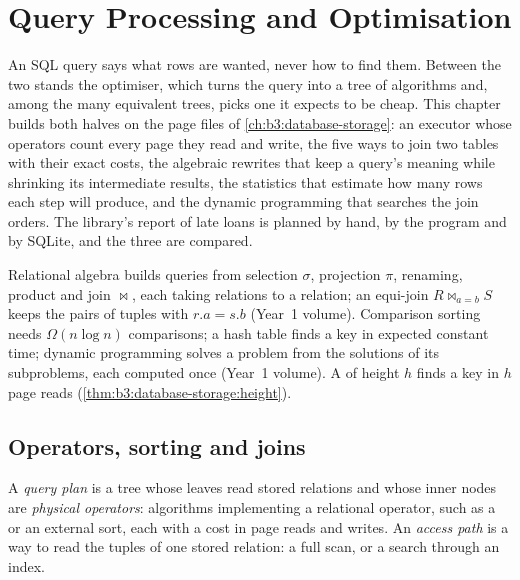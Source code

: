 \chapter{Query Processing and Optimisation}\label{ch:b3:query-optimisation}

An SQL query says what rows are wanted, never how to find them. Between the two stands the optimiser, which turns the query into a tree of algorithms and, among the many equivalent trees, picks one it expects to be cheap. This chapter builds both halves on the page files of \cref{ch:b3:database-storage}: an executor whose operators count every page they read and write, the five ways to join two tables with their exact costs, the algebraic rewrites that keep a query's meaning while shrinking its intermediate results, the statistics that estimate how many rows each step will produce, and the dynamic programming that searches the join orders. The library's report of late loans is planned by hand, by the program and by SQLite, and the three are compared.

\begin{recall}
Relational algebra builds queries from selection $\sigma$, projection $\pi$, renaming, product and join $\bowtie$, each taking relations to a relation; an equi-join $R \bowtie_{a = b} S$ keeps the pairs of tuples with $r.a = s.b$ (Year~1 volume). Comparison sorting needs $\Omega(n \log n)$ comparisons; a hash table finds a key in expected constant time; dynamic programming solves a problem from the solutions of its subproblems, each computed once (Year~1 volume). A  of height $h$ finds a key in $h$ page reads (\cref{thm:b3:database-storage:height}).
\end{recall}

\section{Operators, sorting and joins}\label{sec:b3:query-optimisation:operators}

\begin{definition}\label{def:b3:query-optimisation:plan}
A \emph{query plan} is a tree whose leaves read stored relations and whose inner nodes are \emph{physical operators}: algorithms implementing a relational operator, such as a  or an external sort, each with a cost in page reads and writes. An \emph{access path} is a way to read the tuples of one stored relation: a full scan, or a search through an index.
\end{definition}

